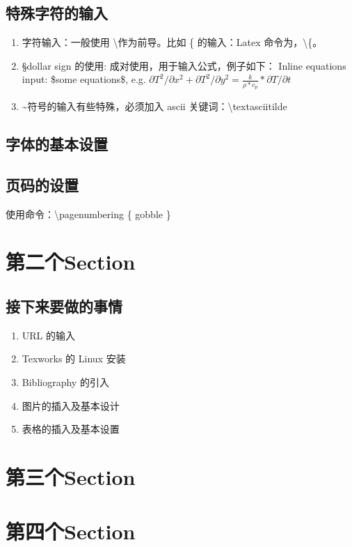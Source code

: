 \documentclass[UTF8,fancyhdr,a4paper]{ctexart}
\begin{document}
\subsection{特殊字符的输入}

\begin{enumerate}
\item
字符输入：一般使用 \textbackslash \space 作为前导。比如 \{ 的输入：Latex 命令为，\textbackslash \{。

\item 
\S \space dollar sign 的使用: 成对使用，用于输入公式，例子如下：
Inline equations input: \$some equations\$, e.g. $\partial T^2/\partial x^2 + \partial T^2/\partial y^2 =\frac{k}{\rho*c_p}*{\partial T/\partial t} $

\item
\textasciitilde 符号的输入有些特殊，必须加入 ascii 关键词：\textbackslash textasciitilde

\end{enumerate}

\subsection{字体的基本设置}



\subsection{页码的设置}
使用命令：\textbackslash pagenumbering \{ gobble \}

\newpage
\section{第二个Section}

\subsection{接下来要做的事情}
\begin{enumerate}
\item
URL 的输入
\item
Texworks 的 Linux 安装
\item
Bibliography 的引入
\item
图片的插入及基本设计
\item
表格的插入及基本设置



\end{enumerate}

\newpage
\section{第三个Section}

\newpage
\section{第四个Section}
\end{document}
